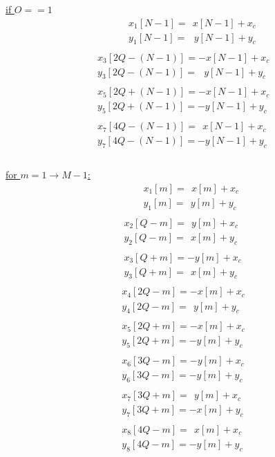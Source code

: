 \documentclass{article}
\begin{document}
\begin{enumerate}
        \underline{if $O == 1$}
        \begin{align*}
            &\quad \quad \quad \ x_{1}[N - 1] = \ \ x[N - 1] + x_c \\
            &\quad \quad \quad \ y_{1}[N - 1] = \ \ \ y[N - 1] + y_c \\ \\
            &x_{3}[2Q - (N - 1)] = -x[N - 1] + x_c \\
            &y_{3}[2Q - (N - 1)] = \ \ \ y[N - 1] + y_c \\ \\
            &x_{5}[2Q + (N - 1)] = -x[N - 1] + x_c \\
            &y_{5}[2Q + (N - 1)] = -y[N - 1] + y_c \\ \\
            &x_{7}[4Q - (N - 1)] = \ \ x[N - 1] + x_c \\
            &y_{7}[4Q - (N - 1)] = -y[N - 1] + y_c \\ \\
          \end{align*}

        \underline{for $m = 1 \rightarrow M - 1$:} \\
        \begin{align*}
            &\quad \quad \ x_{1}[m] = \ \ x[m] + x_c \\ 
            &\quad \quad \ y_{1}[m] = \ \ y[m] + y_c \\ \\
            &\ x_{2}[Q - m] = \ \ y[m] + x_c \\
            &\ y_{2}[Q - m] = \ \ x[m] + y_c \\ \\
            &\ x_{3}[Q + m] = -y[m] + x_c \\
            &\ y_{3}[Q + m] = \ \ x[m] + y_c \\ \\
            &x_{4}[2Q - m] = -x[m] + x_c \\
            &y_{4}[2Q - m] = \ \ y[m] + y_c \\ \\
            &x_{5}[2Q + m] = -x[m] + x_c \\
            &y_{5}[2Q + m] = -y[m] + y_c \\ \\
            &x_{6}[3Q - m] = -y[m] + x_c \\
            &y_{6}[3Q - m] = -y[m] + y_c \\ \\
            &x_{7}[3Q + m] = \ \ y[m] + x_c \\
            &y_{7}[3Q + m] = -x[m] + y_c \\ \\
            &x_{8}[4Q - m] = \ \ x[m] + x_c \\
            &y_{8}[4Q - m] = -y[m] + y_c \\ \\
          \end{align*}

\end{enumerate}
\end{document}
